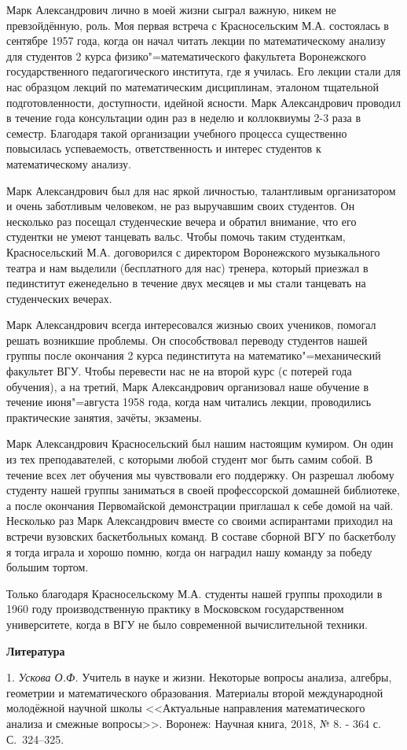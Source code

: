 Марк Александрович лично в моей жизни сыграл важную, никем не превзойдённую, роль. Моя первая встреча с Красносельским М.А.
состоялась в сентябре 1957 года, когда он начал читать лекции по математическому анализу для студентов 2 курса
физико"=математического факультета Воронежского государственного педагогического института, где я училась. Его лекции стали для нас
образцом лекций по математическим дисциплинам, эталоном тщательной подготовленности, доступности, идейной ясности. Марк
Александрович проводил в течение года консультации один раз в неделю и коллоквиумы 2-3 раза в семестр. Благодаря такой
организации учебного процесса существенно повысилась успеваемость, ответственность и интерес студентов к
математическому анализу.

Марк Александрович был для нас яркой личностью, талантливым организатором и очень заботливым человеком, не раз выручавшим
своих студентов. Он несколько раз посещал студенческие вечера и обратил внимание, что его студентки не умеют танцевать
вальс. Чтобы помочь таким студенткам, Красносельский М.А. договорился с директором Воронежского музыкального театра и нам выделили
(бесплатного для нас) тренера, который приезжал в пединститут еженедельно в течение двух месяцев и мы стали танцевать на
студенческих вечерах.

Марк Александрович всегда интересовался жизнью своих учеников, помогал решать возникшие проблемы. Он способствовал
переводу студентов нашей группы после окончания 2 курса пединститута на математико"=механический факультет ВГУ. Чтобы
перевести нас не на второй курс (с потерей года обучения), а на третий, Марк Александрович организовал наше обучение
в течение июня"=августа 1958 года, когда нам читались лекции, проводились практические занятия, зачёты, экзамены.

Марк Александрович Красносельский был нашим настоящим кумиром. Он один из тех преподавателей, с которыми любой студент
мог быть самим собой. В течение всех лет обучения мы чувствовали его поддержку. Он разрешал любому студенту нашей
группы заниматься в своей профессорской домашней библиотеке, а после окончания Первомайской демонстрации приглашал
к себе домой на чай. Несколько раз Марк Александрович вместе со своими аспирантами приходил на встречи вузовских
баскетбольных команд. В составе сборной ВГУ по баскетболу я тогда играла и хорошо помню, когда он наградил нашу
команду за победу большим тортом.

Только благодаря Красносельскому М.А. студенты нашей группы проходили в 1960 году производственную практику в Московском
государственном университете, когда в ВГУ не было современной вычислительной техники.


\smallskip \centerline {\bf Литература} \nopagebreak

1. {\it Ускова О.Ф.} Учитель в науке и жизни. Некоторые вопросы анализа, алгебры, геометрии и математического образования.
Материалы второй международной молодёжной научной школы <<Актуальные направления математического анализа и смежные вопросы>>.
Воронеж: Научная книга, 2018, № 8. - 364 с. С.~324--325.
